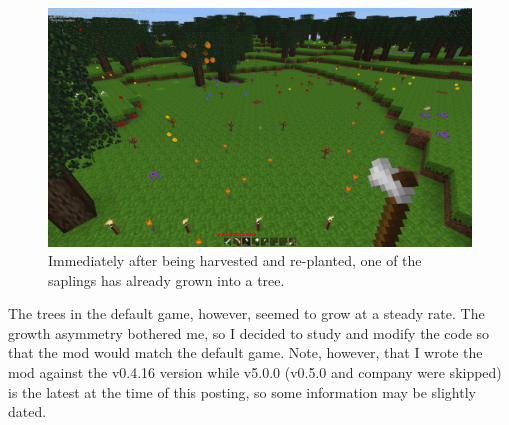 \documentclass{article}
\begin{document}
\begin{figure}
\includegraphics[scale=0.33]{files/blog/2019_03_31_tree_growth_in_minetest/2019_03_31_harvested.png}
\caption{Immediately after being harvested and re-planted, one of the saplings has already grown into a tree.}
\end{figure}

The trees in the default game, however, seemed to grow at a steady rate.  The growth asymmetry bothered me, so I decided to study and modify the code so that the mod would match the default game.  Note, however, that I wrote the mod against the v0.4.16 version while v5.0.0 (v0.5.0 and company were skipped) is the latest at the time of this posting, so some information may be slightly dated.
\end{document}
